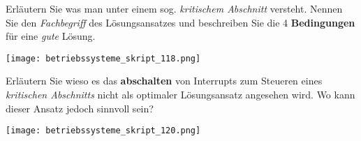 \documentclass{article}
\begin{document}
\begin{tcolorbox}[colback=white!10!white,colframe=lightgray!75!black,
  savelowerto=\jobname_ex.tex,breakable,enhanced,lines before break=40]

\begin{center}
Erläutern Sie was man unter einem sog. 
\textit{kritischem Abschnitt
} versteht. Nennen Sie den 
\textit{Fachbegriff
} des Lösungsansatzes und beschreiben Sie die 4 
\textbf{Bedingungen
} für eine 
\textit{gute
} Lösung.

\end{center}

\tcblower

\justifying
\begin{center}
\texttt{[image: betriebssysteme\_skript\_118.png]}
\end{center}

\end{tcolorbox}
\begin{tcolorbox}[colback=white!10!white,colframe=lightgray!75!black,
  savelowerto=\jobname_ex.tex,breakable,enhanced,lines before break=40]

\begin{center}
Erläutern Sie wieso es das 
\textbf{abschalten
} von Interrupts zum Steueren eines 
\textit{kritischen Abschnitts
} nicht als optimaler Lösungsansatz angesehen wird. Wo kann dieser Ansatz jedoch sinnvoll sein?

\end{center}

\tcblower

\justifying
\begin{center}
\texttt{[image: betriebssysteme\_skript\_120.png]}
\end{center}

\end{tcolorbox}
\end{document}
